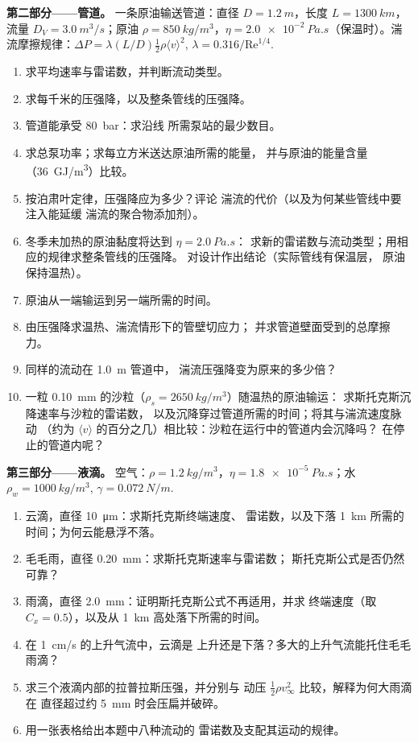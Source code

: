 \begin{problem}
\medskip
\noindent\textbf{第二部分——管道。}
一条原油输送管道：直径 $D = \qty{1.2}{m}$，长度 $L = \qty{1300}{km}$，
流量 $D_V = \qty{3.0}{m^3/s}$；原油 $\rho = \qty{850}{kg/m^3}$，$\eta =
\qty{2.0e-2}{Pa.s}$（保温时）。湍流摩擦规律：$\Delta P = \lambda
(L/D)\tfrac12\rho\langle v\rangle^2$, $\lambda = 0.316/\mathrm{Re}^{1/4}$.
\begin{enumerate}[resume]
  \item 求平均速率与雷诺数，并判断流动类型。
  \item 求每千米的压强降，以及整条管线的压强降。
  \item 管道能承受 \qty{80}{bar}：求沿线
        所需泵站的最少数目。
  \item 求总泵功率；求每立方米送达原油所需的能量，
        并与原油的能量含量（\qty{36}{GJ/m^3}）比较。
  \item 按泊肃叶定律，压强降应为多少？评论
        湍流的代价（以及为何某些管线中要注入能延缓
        湍流的聚合物添加剂）。
  \item 冬季未加热的原油黏度将达到 $\eta = \qty{2.0}{Pa.s}$：
        求新的雷诺数与流动类型；用相应的规律求整条管线的压强降。
        对设计作出结论（实际管线有保温层，
        原油保持温热）。
  \item 原油从一端输运到另一端所需的时间。
  \item 由压强降求温热、湍流情形下的管壁切应力；
        并求管道壁面受到的总摩擦力。
  \item 同样的流动在 \qty{1.0}{m} 管道中，
        湍流压强降变为原来的多少倍？
  \item 一粒 \qty{0.10}{mm} 的沙粒（$\rho_s = \qty{2650}{kg/m^3}$）随温热的原油输运：
        求斯托克斯沉降速率与沙粒的雷诺数，
        以及沉降穿过管道所需的时间；将其与湍流速度脉动
        （约为 $\langle v
        \rangle$ 的百分之几）相比较：沙粒在运行中的管道内会沉降吗？
        在停止的管道内呢？
\end{enumerate}

\medskip
\noindent\textbf{第三部分——液滴。}
空气：$\rho = \qty{1.2}{kg/m^3}$，$\eta = \qty{1.8e-5}{Pa.s}$；水 $\rho_w =
\qty{1000}{kg/m^3}$, $\gamma = \qty{0.072}{N/m}$.
\begin{enumerate}[resume]
  \item 云滴，直径 \qty{10}{\micro m}：求斯托克斯终端速度、
        雷诺数，以及下落 \qty{1}{km} 所需的时间；为何云能悬浮不落。
  \item 毛毛雨，直径 \qty{0.20}{mm}：求斯托克斯速率与雷诺数；
        斯托克斯公式是否仍然可靠？
  \item 雨滴，直径 \qty{2.0}{mm}：证明斯托克斯公式不再适用，并求
        终端速度（取 $C_x = 0.5$），以及从 \qty{1}{km} 高处落下所需的时间。
  \item 在 \qty{1}{cm/s} 的上升气流中，云滴是
        上升还是下落？多大的上升气流能托住毛毛雨滴？
  \item 求三个液滴内部的拉普拉斯压强，并分别与
        动压 $\tfrac12\rho v_\infty^2$ 比较，解释为何大雨滴在
        直径超过约 \qty{5}{mm} 时会压扁并破碎。
  \item 用一张表格给出本题中八种流动的
        雷诺数及支配其运动的规律。
\end{enumerate}
\end{problem}

